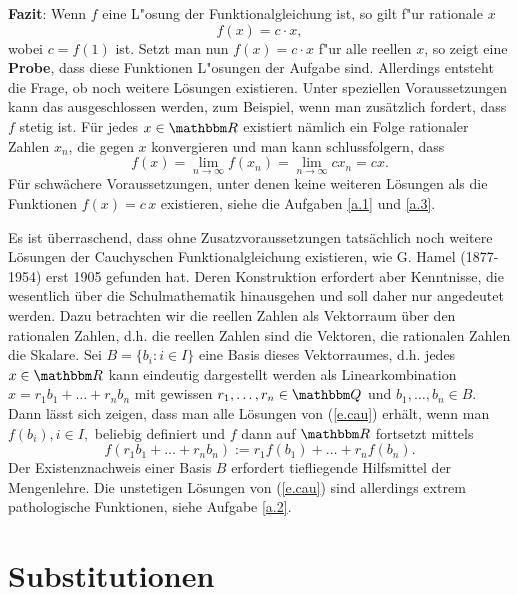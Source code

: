 \documentclass[11pt]{article}
\begin{document}
{\bf Fazit}: Wenn $f$ eine L"osung der Funktionalgleichung ist, so gilt f"ur
rationale $x$
\begin{equation}\label{e.loe}
f(x) = c\cdot x,
\end{equation}
wobei $c = f(1)$ ist. Setzt man nun $f(x)=c\cdot x$ f"ur alle reellen $x$, so
zeigt eine {\bf Probe}, da{ss} diese Funktionen L"osungen der Aufgabe sind.
Allerdings entsteht die Frage, ob noch weitere L\"{o}sungen existieren. Unter
speziellen Voraussetzungen kann das ausgeschlossen werden, zum Beispiel, wenn
man zus\"{a}tzlich fordert, da{ss} $f$ stetig ist. F\"{u}r jedes $x\in\R$
existiert n\"{a}mlich ein Folge rationaler Zahlen $x_n$, die gegen $x$
konvergieren und man kann schlu{ss}folgern, da{ss}
\[f(x)=\lim_{n\to\infty} f(x_n)=\lim_{n\to\infty}cx_n=cx.\]
F\"{u}r schw\"{a}chere Voraussetzungen, unter denen keine weiteren
L\"{o}sungen als die Funktionen $f(x) = c\,x$ existieren, siehe die Aufgaben
\ref{a.1} und \ref{a.3}. 

Es ist \"{u}berraschend, da{ss} ohne Zusatzvoraussetzungen tats\"{a}chlich noch
weitere L\"{o}sungen der Cauchyschen Funktionalgleichung existieren, wie
G. Hamel (1877-1954) erst 1905 gefunden hat. Deren Konstruktion erfordert aber
Kenntnisse, die wesentlich \"{u}ber die Schulmathematik hinausgehen und soll
daher nur angedeutet werden.  Dazu betrachten wir die reellen Zahlen als
Vektorraum \"{u}ber den rationalen Zahlen, d.h. die reellen Zahlen sind die
{\glqq}Vektoren{\grqq}, die rationalen Zahlen die {\glqq}Skalare{\grqq}. Sei
$B=\{b_i:i\in I\}$ eine Basis dieses Vektorraumes, d.h. jedes $x\in\R$ kann
eindeutig dargestellt werden als Linearkombination $x=r_1b_1+\ldots+r_nb_n$
mit gewissen $r_1,\ldots,r_n\in\Q$ und $b_1,\ldots,b_n\in B$. Dann l\"{a}{ss}t
sich zeigen, da{ss} man alle L\"{o}sungen von (\ref{e.cau}) erh\"{a}lt, wenn
man $f(b_i),i\in I,$ beliebig definiert und $f$ dann auf $\R$ fortsetzt mittels
\[f(r_1b_1+\ldots+r_nb_n):=r_1f(b_1)+\ldots+r_nf(b_n).\]
Der Existenznachweis einer Basis $B$ erfordert tiefliegende Hilfsmittel der
Mengenlehre. Die unstetigen L\"{o}sungen von (\ref{e.cau}) sind allerdings
extrem pathologische Funktionen, siehe Aufgabe \ref{a.2}.

\section{Substitutionen}
\end{document}
